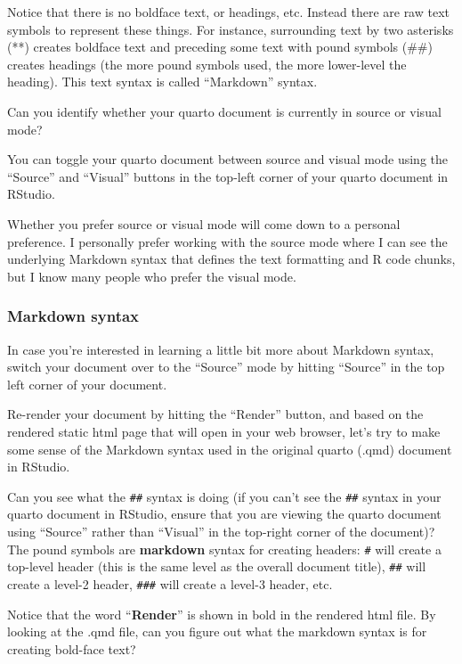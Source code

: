 \documentclass[
  letterpaper,
  DIV=11,
  numbers=noendperiod]{scrreprt}
\begin{document}
Notice that there is no boldface text, or headings, etc. Instead there
are raw text symbols to represent these things. For instance,
surrounding text by two asterisks (**) creates boldface text and
preceding some text with pound symbols (\#\#) creates headings (the more
pound symbols used, the more lower-level the heading). This text syntax
is called ``Markdown'' syntax.

Can you identify whether your quarto document is currently in source or
visual mode?

You can toggle your quarto document between source and visual mode using
the ``Source'' and ``Visual'' buttons in the top-left corner of your
quarto document in RStudio.

Whether you prefer source or visual mode will come down to a personal
preference. I personally prefer working with the source mode where I can
see the underlying Markdown syntax that defines the text formatting and
R code chunks, but I know many people who prefer the visual mode.

\subsubsection{Markdown syntax}\label{markdown-syntax}

In case you're interested in learning a little bit more about Markdown
syntax, switch your document over to the ``Source'' mode by hitting
``Source'' in the top left corner of your document.

Re-render your document by hitting the ``Render'' button, and based on
the rendered static html page that will open in your web browser, let's
try to make some sense of the Markdown syntax used in the original
quarto (.qmd) document in RStudio.

Can you see what the \texttt{\#\#} syntax is doing (if you can't see the
\texttt{\#\#} syntax in your quarto document in RStudio, ensure that you
are viewing the quarto document using ``Source'' rather than ``Visual''
in the top-right corner of the document)? The pound symbols are
\textbf{markdown} syntax for creating headers: \texttt{\#} will create a
top-level header (this is the same level as the overall document title),
\texttt{\#\#} will create a level-2 header, \texttt{\#\#\#} will create
a level-3 header, etc.

Notice that the word ``\textbf{Render}'' is shown in bold in the
rendered html file. By looking at the .qmd file, can you figure out what
the markdown syntax is for creating bold-face text?
\end{document}
